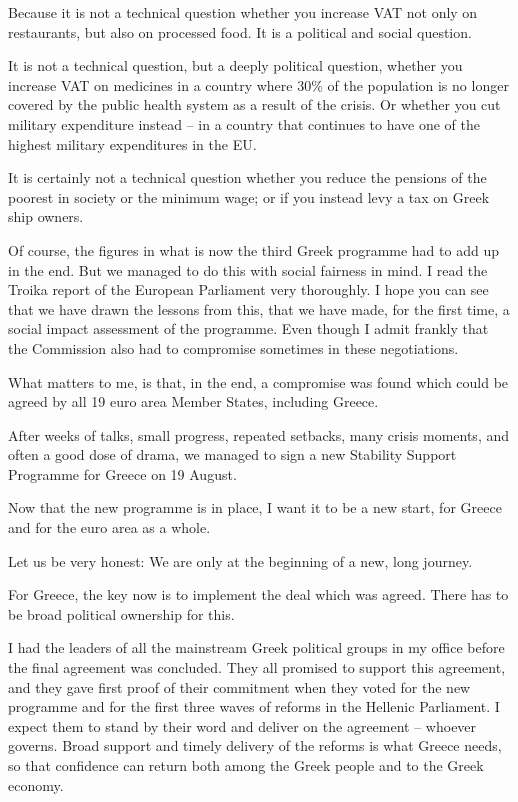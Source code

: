 \documentclass[a4paper,11pt]{article}
\begin{document}
Because it is not a technical question whether you increase VAT not only on restaurants, but also on processed food. It is a political and social question.

It is not a technical question, but a deeply political question, whether you increase VAT on medicines in a country where 30\% of the population is no longer covered by the public health system as a result of the crisis. Or whether you cut military expenditure instead – in a country that continues to have one of the highest military expenditures in the EU.

It is certainly not a technical question whether you reduce the pensions of the poorest in society or the minimum wage; or if you instead levy a tax on Greek ship owners.

Of course, the figures in what is now the third Greek programme had to add up in the end. But we managed to do this with social fairness in mind. I read the Troika report of the European Parliament very thoroughly. I hope you can see that we have drawn the lessons from this, that we have made, for the first time, a social impact assessment of the programme. Even though I admit frankly that the Commission also had to compromise sometimes in these negotiations.

What matters to me, is that, in the end, a compromise was found which could be agreed by all 19 euro area Member States, including Greece.

After weeks of talks, small progress, repeated setbacks, many crisis moments, and often a good dose of drama, we managed to sign a new Stability Support Programme for Greece on 19 August.

Now that the new programme is in place, I want it to be a new start, for Greece and for the euro area as a whole.

Let us be very honest: We are only at the beginning of a new, long journey.

For Greece, the key now is to implement the deal which was agreed. There has to be broad political ownership for this.

I had the leaders of all the mainstream Greek political groups in my office before the final agreement was concluded. They all promised to support this agreement, and they gave first proof of their commitment when they voted for the new programme and for the first three waves of reforms in the Hellenic Parliament. I expect them to stand by their word and deliver on the agreement – whoever governs. Broad support and timely delivery of the reforms is what Greece needs, so that confidence can return both among the Greek people and to the Greek economy.
\end{document}
